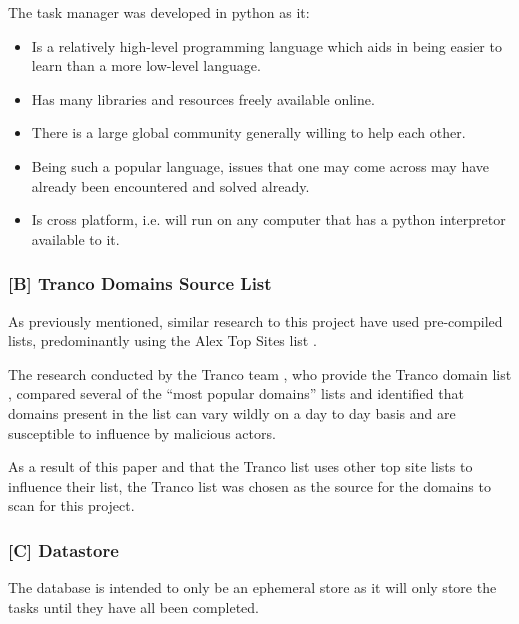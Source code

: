 \documentclass{mscreport}
\begin{document}
\noindent
The task manager was developed in python as it:

\begin{itemize}
	\setlength\itemsep{0.1em}
    \item Is a relatively high-level programming language which aids in being easier to learn than a more low-level language.
    \item Has many libraries and resources freely available online.
    \item There is a large global community generally willing to help each other.
    \item Being such a popular language, issues that one may come across may have already been encountered and solved already.
    \item Is cross platform, i.e. will run on any computer that has a python interpretor available to it.
\end{itemize}

\subsubsection{[B] Tranco Domains Source List}

As previously mentioned, similar research to this project have used pre-compiled lists, predominantly using the Alex Top Sites list \cite{Buchanan2018-xz,Chen2016-dl,Kumar2017-qw,Patil2017-bg,Ying2016-ag,Michael2015-hn,Van_Goethem2014-ao,Holz2020-ha,Poteat2021-zr}.

\vspace{0.3cm} \noindent
The research conducted by the Tranco team \cite{Le_Pochat2018-ql}, who provide the Tranco domain list \cite{noauthor_undated-mt}, compared several of the ``most popular domains'' lists and identified that domains present in the list can vary wildly on a day to day basis and are susceptible to influence by malicious actors.

\vspace{0.3cm} \noindent
As a result of this paper and that the Tranco list uses other top site lists to influence their list, the Tranco list \cite{noauthor_undated-mt} was chosen as the source for the domains to scan for this project.

\subsubsection{[C] Datastore}

The database is intended to only be an ephemeral store as it will only store the tasks until they have all been completed.
\end{document}
